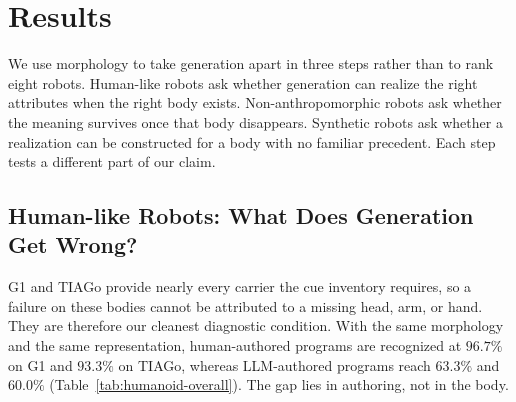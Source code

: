 
\section{Results}
\label{sec:analysis}
We use morphology to take generation apart in three steps rather than to rank eight robots. Human-like robots ask whether generation can realize the right attributes when the right body exists. Non-anthropomorphic robots ask whether the meaning survives once that body disappears. Synthetic robots ask whether a realization can be constructed for a body with no familiar precedent. Each step tests a different part of our claim.

\subsection{Human-like Robots: What Does Generation Get Wrong?}
\label{sec:results-humanlike}
G1 and TIAGo provide nearly every carrier the cue inventory requires, so a failure on these bodies cannot be attributed to a missing head, arm, or hand. They are therefore our cleanest diagnostic condition. With the same morphology and the same representation, human-authored programs are recognized at $96.7\%$ on G1 and $93.3\%$ on TIAGo, whereas LLM-authored programs reach $63.3\%$ and $60.0\%$ (Table~\ref{tab:humanoid-overall}). The gap lies in authoring, not in the body.


